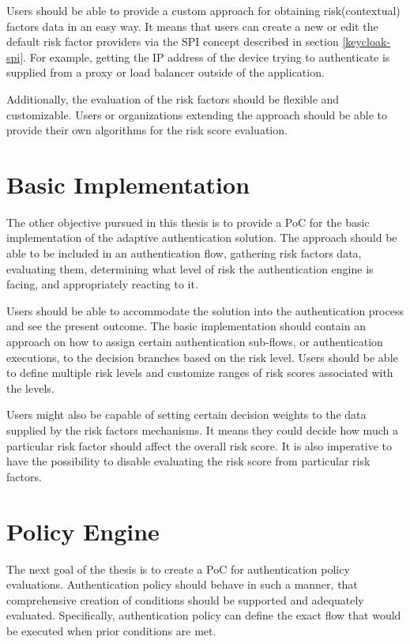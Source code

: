 Users should be able to provide a custom approach for obtaining risk(contextual) factors data in an easy way.
It means that users can create a new or edit the default risk factor providers via the SPI concept described in section \ref{keycloak-spi}.
For example, getting the IP address of the device trying to authenticate is supplied from a proxy or load balancer outside of the application.

Additionally, the evaluation of the risk factors should be flexible and customizable.
Users or organizations extending the approach should be able to provide their own algorithms for the risk score evaluation.

\section{Basic Implementation}
The other objective pursued in this thesis is to provide a PoC for the basic implementation of the adaptive authentication solution.
The approach should be able to be included in an authentication flow, gathering risk factors data, evaluating them, determining what level of risk the authentication engine is facing, and appropriately reacting to it.

Users should be able to accommodate the solution into the authentication process and see the present outcome.
The basic implementation should contain an approach on how to assign certain authentication sub-flows, or authentication executions, to the decision branches based on the risk level.
Users should be able to define multiple risk levels and customize ranges of risk scores associated with the levels.

Users might also be capable of setting certain decision weights to the data supplied by the risk factors mechanisms.
It means they could decide how much a particular risk factor should affect the overall risk score.
It is also imperative to have the possibility to disable evaluating the risk score from particular risk factors.

\section{Policy Engine}
The next goal of the thesis is to create a PoC for authentication policy evaluations.
Authentication policy should behave in such a manner, that comprehensive creation of conditions should be supported and adequately evaluated.
Specifically, authentication policy can define the exact flow that would be executed when prior conditions are met.

